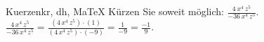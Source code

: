 \begin{MAufgabe}{Kuerzen}{kr, dh, MaTeX}
K\"urzen Sie soweit m\"oglich: $\frac{4\, x^4\, z^5}{- 36\, x^4\, z^5}$.\\ 
\ifLsg\MLoesung
\quad $\frac{4\, x^4\, z^5}{- 36\, x^4\, z^5}=\frac{(4\, x^4\, z^5)\cdot(1)}{(4\, x^4\, z^5)\cdot(-9)}=\frac{1}{-9}=\frac{-1}{9}$.\else\relax\fi
 \end{MAufgabe}